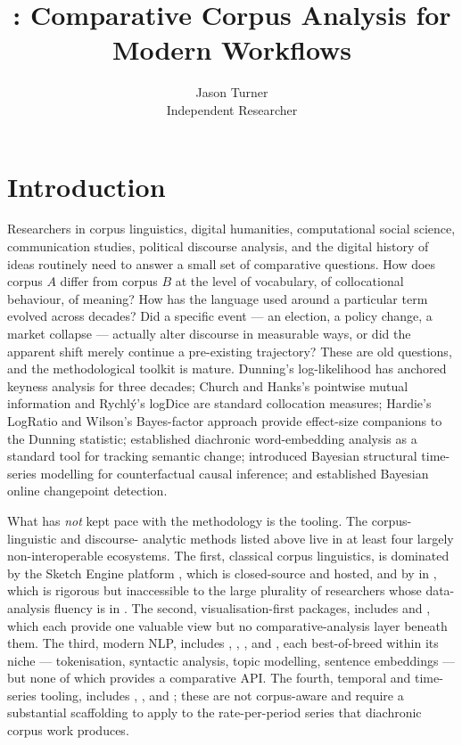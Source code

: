 \documentclass[codesnippet]{jss}
\author{Jason Turner\\Independent Researcher}
\title{\pkg{pycorpdiff}: Comparative Corpus Analysis for Modern \proglang{Python} Workflows}
\begin{document}
\section{Introduction}\label{sec:intro}

Researchers in corpus linguistics, digital humanities,
computational social science, communication studies, political
discourse analysis, and the digital history of ideas routinely
need to answer a small set of comparative questions. How does
corpus $A$ differ from corpus $B$ at the level of vocabulary, of
collocational behaviour, of meaning? How has the language used
around a particular term evolved across decades? Did a specific
event --- an election, a policy change, a market collapse ---
actually alter discourse in measurable ways, or did the
apparent shift merely continue a pre-existing trajectory? These
are old questions, and the methodological toolkit is mature.
Dunning's log-likelihood \citep{dunning1993} has anchored
keyness analysis for three decades; Church and Hanks's pointwise
mutual information \citep{church1991} and Rychl\'y's logDice
\citep{rychly2008} are standard collocation measures; Hardie's
LogRatio \citep{hardie2014logratio} and Wilson's Bayes-factor
approach \citep{wilson2013} provide effect-size companions to the
Dunning statistic; \cite{hamilton2016} established diachronic
word-embedding analysis as a standard tool for tracking semantic
change; \cite{brodersen2015causalimpact} introduced Bayesian
structural time-series modelling for counterfactual causal
inference; and \cite{adams2007bocpd} established Bayesian online
changepoint detection.

What has \emph{not} kept pace with the methodology is the
 tooling. The corpus-linguistic and discourse-
analytic methods listed above live in at least four largely
non-interoperable ecosystems. The first, classical corpus
linguistics, is dominated by the Sketch Engine platform
\citep{kilgarriff2014sketchengine}, which is closed-source and
hosted, and by  \citep{benoit2018quanteda} in
, which is rigorous but inaccessible to the large
plurality of researchers whose data-analysis fluency is in
. The second, visualisation-first packages,
includes  \citep{kessler2017scattertext} and
 \citep{grootendorst2022bertopic}, which each
provide one valuable view but no comparative-analysis layer
beneath them. The third, modern  NLP, includes
 \citep{bird2009nltk}, , , and
 \citep{reimers2019sbert}, each
best-of-breed within its niche --- tokenisation, syntactic
analysis, topic modelling, sentence embeddings --- but none of
which provides a comparative API. The fourth, temporal and
time-series tooling, includes 
\citep{seabold2010statsmodels}, 
\citep{truong2020ruptures}, and ; these are not
corpus-aware and require a substantial scaffolding to apply to
the rate-per-period series that diachronic corpus work produces.
\end{document}
